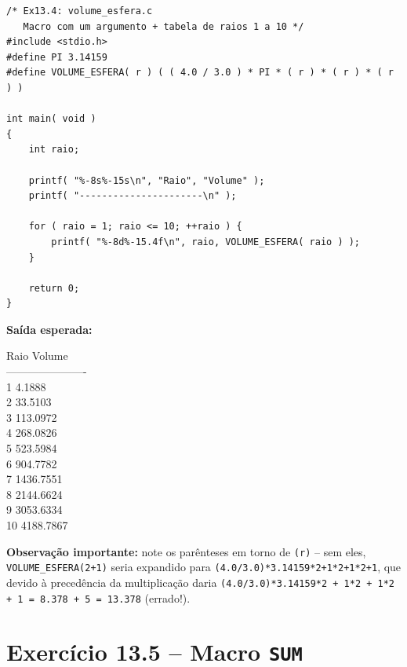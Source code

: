 \documentclass[12pt,a4paper]{article}
\begin{document}
\begin{respostabox}
\begin{lstlisting}
/* Ex13.4: volume_esfera.c
   Macro com um argumento + tabela de raios 1 a 10 */
#include <stdio.h>
#define PI 3.14159
#define VOLUME_ESFERA( r ) ( ( 4.0 / 3.0 ) * PI * ( r ) * ( r ) * ( r ) )

int main( void )
{
    int raio;

    printf( "%-8s%-15s\n", "Raio", "Volume" );
    printf( "----------------------\n" );

    for ( raio = 1; raio <= 10; ++raio ) {
        printf( "%-8d%-15.4f\n", raio, VOLUME_ESFERA( raio ) );
    }

    return 0;
}
\end{lstlisting}

\textbf{Saída esperada:}
\begin{saida}
Raio    Volume\\
----------------------\\
1       4.1888\\
2       33.5103\\
3       113.0972\\
4       268.0826\\
5       523.5984\\
6       904.7782\\
7       1436.7551\\
8       2144.6624\\
9       3053.6334\\
10      4188.7867
\end{saida}

\textbf{Observação importante:} note os parênteses em torno de \texttt{(r)} --
sem eles, \texttt{VOLUME\_ESFERA(2+1)} seria expandido para
\texttt{(4.0/3.0)*3.14159*2+1*2+1*2+1}, que devido à precedência da multiplicação
daria \texttt{(4.0/3.0)*3.14159*2 + 1*2 + 1*2 + 1 = 8.378 + 5 = 13.378} (errado!).
\end{respostabox}

\newpage

\section{Exercício 13.5 -- Macro \texttt{SUM}}
\end{document}

